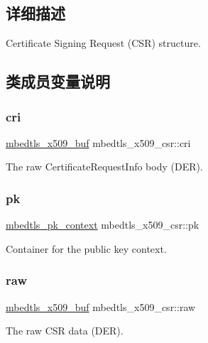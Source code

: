 \subsection{详细描述}
Certificate Signing Request (C\+SR) structure. 

\subsection{类成员变量说明}
\mbox{\label{structmbedtls__x509__csr_a6adcb10c37a6bc946310d54567468f8a}} 
\subsubsection{\texorpdfstring{cri}{cri}}
{\footnotesize\ttfamily \hyperlink{group__x509__module_ga4d02c9e8e4e2934555e0d132cd2976dc}{mbedtls\+\_\+x509\+\_\+buf} mbedtls\+\_\+x509\+\_\+csr\+::cri}

The raw Certificate\+Request\+Info body (D\+ER). \mbox{\label{structmbedtls__x509__csr_abacfec387e945f59a35a106eebba0a1c}} 
\subsubsection{\texorpdfstring{pk}{pk}}
{\footnotesize\ttfamily \hyperlink{structmbedtls__pk__context}{mbedtls\+\_\+pk\+\_\+context} mbedtls\+\_\+x509\+\_\+csr\+::pk}

Container for the public key context. \mbox{\label{structmbedtls__x509__csr_ad3c60458143eb1ddedfa573466931a70}} 
\subsubsection{\texorpdfstring{raw}{raw}}
{\footnotesize\ttfamily \hyperlink{group__x509__module_ga4d02c9e8e4e2934555e0d132cd2976dc}{mbedtls\+\_\+x509\+\_\+buf} mbedtls\+\_\+x509\+\_\+csr\+::raw}

The raw C\+SR data (D\+ER). \mbox{\label{structmbedtls__x509__csr_afaf345aa794cfd4b5056ce49a67bb611}} 
